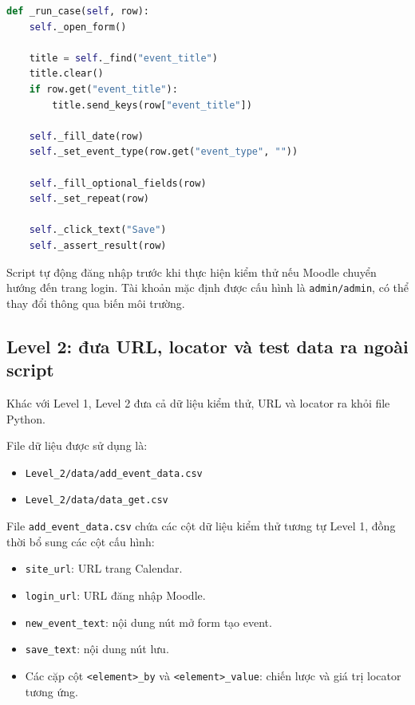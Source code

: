 \documentclass[12pt,a4paper]{article}
\begin{document}
\begin{lstlisting}[language=Python]
def _run_case(self, row):
    self._open_form()

    title = self._find("event_title")
    title.clear()
    if row.get("event_title"):
        title.send_keys(row["event_title"])

    self._fill_date(row)
    self._set_event_type(row.get("event_type", ""))

    self._fill_optional_fields(row)
    self._set_repeat(row)

    self._click_text("Save")
    self._assert_result(row)
\end{lstlisting}

Script tự động đăng nhập trước khi thực hiện kiểm thử nếu Moodle chuyển hướng đến trang login. Tài khoản mặc định được cấu hình là \texttt{admin/admin}, có thể thay đổi thông qua biến môi trường.

\subsection{Level 2: đưa URL, locator và test data ra ngoài script}

Khác với Level 1, Level 2 đưa cả dữ liệu kiểm thử, URL và locator ra khỏi file Python.

File dữ liệu được sử dụng là:

\begin{itemize}[noitemsep]
    \item \texttt{Level\_2/data/add\_event\_data.csv}
    \item \texttt{Level\_2/data/data\_get.csv}
\end{itemize}

File \texttt{add\_event\_data.csv} chứa các cột dữ liệu kiểm thử tương tự Level 1, đồng thời bổ sung các cột cấu hình:

\begin{itemize}[noitemsep]
    \item \texttt{site\_url}: URL trang Calendar.
    \item \texttt{login\_url}: URL đăng nhập Moodle.
    \item \texttt{new\_event\_text}: nội dung nút mở form tạo event.
    \item \texttt{save\_text}: nội dung nút lưu.
    \item Các cặp cột \texttt{<element>\_by} và \texttt{<element>\_value}: chiến lược và giá trị locator tương ứng.
\end{itemize}
\end{document}
